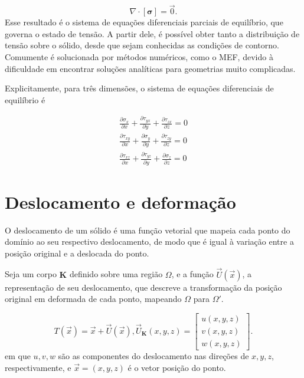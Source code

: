 \begin{equation}
    \nabla \cdot [\bm{\sigma}] = \vec{0}.
\end{equation}
Esse resultado é o sistema de equações diferenciais parciais de equilíbrio, que governa o estado de tensão. A partir dele, é possível obter tanto a distribuição de tensão sobre o sólido, desde que sejam conhecidas as condições de contorno. Comumente é solucionada por métodos numéricos, como o MEF, devido à dificuldade em encontrar soluções analíticas para geometrias muito complicadas. 

Explicitamente, para três dimensões, o sistema de equações diferenciais de equilíbrio é

\begin{gather}
       \displaystyle \frac{\partial \sigma_x}{\partial x} + \frac{\partial \tau_{yx}}{\partial y} + \frac{\partial \tau_{zx}}{\partial z} = 0 \\
       \displaystyle \frac{\partial \tau_{xy}}{\partial x} + \frac{\partial \sigma_y}{\partial y} + \frac{\partial \tau_{zy}}{\partial z} = 0 \\
       \displaystyle \frac{\partial \tau_{xz}}{\partial x} + \frac{\partial \tau_{yz}}{\partial y} + \frac{\partial \sigma_z}{\partial z} = 0 
\end{gather}


\section{Deslocamento e deformação}

O deslocamento de um sólido é uma função vetorial que mapeia cada ponto do domínio ao seu respectivo deslocamento, de modo que é igual à variação entre a posição original e a deslocada do ponto.

Seja um corpo $\bm{K}$ definido sobre uma região $\Omega$, e a função $\vec{U}(\vec{x})$, a representação de seu deslocamento, que descreve a transformação da posição original em deformada de cada ponto, mapeando $\Omega$ para $\Omega'$.

\begin{equation}
    T(\vec{x}) = \vec{x} + \vec{U}(\vec{x}),
    \vec{U}_{\bm{K}}(x,y,z) = \begin{bmatrix}
        u(x,y,z) \\ v(x,y,z) \\ w(x,y,z) 
    \end{bmatrix}.
    \label{eq:transformacao}
\end{equation}
em que $u, v, w$ são as componentes do deslocamento nas direções de $x, y, z$, respectivamente, e $\vec{x} = (x,y,z)$ é o vetor posição do ponto.

